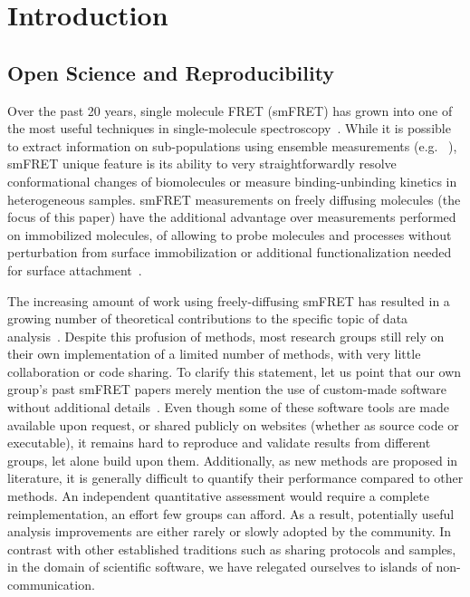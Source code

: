 \section{Introduction}

\subsection{Open Science and Reproducibility}

Over the past 20 years, single molecule FRET (smFRET) has grown into one of the most
useful techniques in single-molecule spectroscopy~\cite{Weiss_1999,Hohlbein_2014}.
While it is possible to extract information on sub-populations using ensemble measurements (e.g. ~\cite{Lerner_2014,Rahamim_2015}),
smFRET unique feature is its ability to very straightforwardly resolve conformational
changes of biomolecules or measure binding-unbinding kinetics in heterogeneous samples.
smFRET measurements on freely diffusing molecules (the focus of this paper) have the additional advantage over measurements performed on immobilized molecules, of allowing to probe molecules and processes without perturbation from surface
immobilization or additional functionalization needed for surface attachment~\cite{Dahan_1999,Eggeling_1998}.

The increasing amount of work using freely-diffusing smFRET has resulted in a growing number of theoretical contributions to the specific topic of data analysis~\cite{Fries_1998,Eggeling_2001,Zhang_2005,Gopich_2005,Lee_2005,Nir_2006,Antonik2006,Gopich_2007,Gopich_2008,Camley_2009,Santoso_2010,Torella_2011,Tomov_2012}. Despite this profusion of methods, most research groups still rely on their own implementation of a limited number of methods, with very little collaboration or code sharing. To clarify this statement, let us point that our own group's past smFRET papers merely mention the use of custom-made software without
additional details~\cite{Lee_2005,Nir_2006}. Even though some of these software tools are made available upon request, or shared publicly on websites (whether as source code or executable), it remains hard to reproduce and validate results from different groups, let alone build upon them. 
Additionally, as new methods are proposed in literature,
it is generally difficult to quantify their performance compared to other methods.
An independent quantitative assessment
would require a complete reimplementation, an effort few groups can afford.
As a result, potentially useful analysis improvements
are either rarely or slowly adopted by the community.
In contrast with other established traditions such as
sharing protocols and samples, in the domain of scientific software,
we have relegated ourselves to islands of non-communication.

